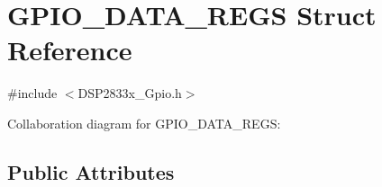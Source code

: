 \hypertarget{struct_g_p_i_o___d_a_t_a___r_e_g_s}{}\section{G\+P\+I\+O\+\_\+\+D\+A\+T\+A\+\_\+\+R\+E\+G\+S Struct Reference}
\label{struct_g_p_i_o___d_a_t_a___r_e_g_s}


{\ttfamily \#include $<$D\+S\+P2833x\+\_\+\+Gpio.\+h$>$}



Collaboration diagram for G\+P\+I\+O\+\_\+\+D\+A\+T\+A\+\_\+\+R\+E\+G\+S\+:
\subsection*{Public Attributes}
